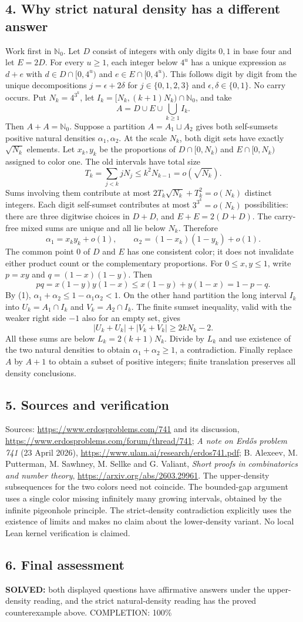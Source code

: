 \subsection*{4. Why strict natural density has a different answer}
Work first in $\mathbb N_0$. Let $D$ consist of integers with only digits $0,1$ in base four and let $E=2D$. For every $u\ge1$, each integer below $4^u$ has a unique expression as $d+e$ with $d\in D\cap[0,4^u)$ and $e\in E\cap[0,4^u)$. This follows digit by digit from the unique decompositions $j=\epsilon+2\delta$ for $j\in\{0,1,2,3\}$ and $\epsilon,\delta\in\{0,1\}$. No carry occurs.
Put $N_k=4^{3^k}$, let $I_k=[N_k,(k+1)N_k)\cap\mathbb N_0$, and take
\[
 A=D\cup E\cup\bigcup_{k\ge1}I_k.
\]
Then $A+A=\mathbb N_0$. Suppose a partition $A=A_1\sqcup A_2$ gives both self-sumsets positive natural densities $\alpha_1,\alpha_2$.
At the scale $N_k$, both digit sets have exactly $\sqrt{N_k}$ elements. Let $x_k,y_k$ be the proportions of $D\cap[0,N_k)$ and $E\cap[0,N_k)$ assigned to color one. The old intervals have total size
\[
 T_k=\sum_{j<k}jN_j\le k^2N_{k-1}=o(\sqrt{N_k}).
\]
Sums involving them contribute at most $2T_k\sqrt{N_k}+T_k^2=o(N_k)$ distinct integers. Each digit self-sumset contributes at most $3^{3^k}=o(N_k)$ possibilities: there are three digitwise choices in $D+D$, and $E+E=2(D+D)$. The carry-free mixed sums are unique and all lie below $N_k$. Therefore
\[
 \alpha_1=x_ky_k+o(1),\qquad
 \alpha_2=(1-x_k)(1-y_k)+o(1). \tag{1}
\]
The common point $0$ of $D$ and $E$ has one consistent color; it does not invalidate either product count or the complementary proportions.
For $0\le x,y\le1$, write $p=xy$ and $q=(1-x)(1-y)$. Then
\[
 pq=x(1-y)y(1-x)\le x(1-y)+y(1-x)=1-p-q.
\]
By (1), $\alpha_1+\alpha_2\le1-\alpha_1\alpha_2<1$.
On the other hand partition the long interval $I_k$ into $U_k=A_1\cap I_k$ and $V_k=A_2\cap I_k$. The finite sumset inequality, valid with the weaker right side $-1$ also for an empty set, gives
\[
 |U_k+U_k|+|V_k+V_k|\ge2kN_k-2.
\]
All these sums are below $L_k=2(k+1)N_k$. Divide by $L_k$ and use existence of the two natural densities to obtain $\alpha_1+\alpha_2\ge1$, a contradiction. Finally replace $A$ by $A+1$ to obtain a subset of positive integers; finite translation preserves all density conclusions.
\subsection*{5. Sources and verification}
Sources: \url{https://www.erdosproblems.com/741} and its discussion, \url{https://www.erdosproblems.com/forum/thread/741}; \emph{A note on Erd\H{o}s problem 741} (23 April 2026), \url{https://www.ulam.ai/research/erdos741.pdf}; B. Alexeev, M. Putterman, M. Sawhney, M. Sellke and G. Valiant, \emph{Short proofs in combinatorics and number theory}, \url{https://arxiv.org/abs/2603.29961}.
The upper-density subsequences for the two colors need not coincide. The bounded-gap argument uses a single color missing infinitely many growing intervals, obtained by the infinite pigeonhole principle. The strict-density contradiction explicitly uses the existence of limits and makes no claim about the lower-density variant. No local Lean kernel verification is claimed.
\subsection*{6. Final assessment}
\textbf{SOLVED:} both displayed questions have affirmative answers under the upper-density reading, and the strict natural-density reading has the proved counterexample above.
\noindent COMPLETION: 100\%
